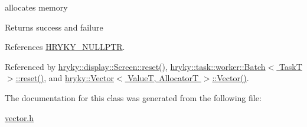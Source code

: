 allocates memory 

\begin{DoxyReturn}{Returns}
success and failure 
\end{DoxyReturn}


References \hyperlink{common_8h_a4cd4ac09cfcdbd6b30ee69afc156e210}{H\-R\-Y\-K\-Y\-\_\-\-N\-U\-L\-L\-P\-T\-R}.



Referenced by \hyperlink{classhryky_1_1display_1_1_screen_a1c77857a9711011c99c2ec453cce4581}{hryky\-::display\-::\-Screen\-::reset()}, \hyperlink{group__task_ga88b1f6b27be23acb9fd42203d7cd3933}{hryky\-::task\-::worker\-::\-Batch$<$ Task\-T $>$\-::reset()}, and \hyperlink{classhryky_1_1_vector_add56505400891e26f0b370ed65bb1797}{hryky\-::\-Vector$<$ Value\-T, Allocator\-T $>$\-::\-Vector()}.



The documentation for this class was generated from the following file\-:\begin{DoxyCompactItemize}
\item 
\hyperlink{vector_8h}{vector.\-h}\end{DoxyCompactItemize}
